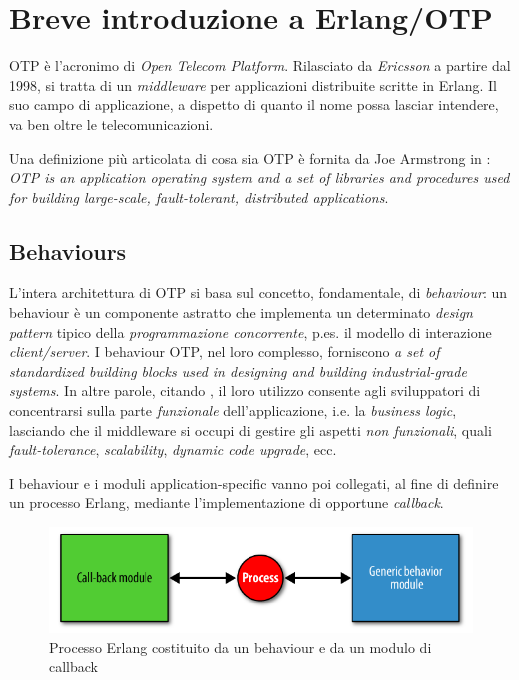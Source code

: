 %
\section{Breve introduzione a Erlang/OTP}
%
OTP \`e l'acronimo di \emph{Open Telecom Platform}. Rilasciato da \emph{Ericsson} 
a partire dal 1998, si tratta di un \emph{middleware} per applicazioni distribuite 
scritte in Erlang\cite{erlang}. Il suo campo di applicazione, a dispetto di quanto 
il nome possa lasciar intendere, va ben oltre le telecomunicazioni.
%

%
Una definizione pi\`u articolata di cosa sia OTP \`e fornita da Joe Armstrong in 
\cite{armstrong07}: \emph{OTP is an application operating system and a set of libraries 
and procedures used for building large-scale, fault-tolerant, distributed applications}.
%

%
\subsection{Behaviours}
%
L'intera architettura di OTP si basa sul concetto, fondamentale, di \emph{behaviour}:
un behaviour \`e un componente astratto che implementa un determinato 
\emph{design pattern} tipico della \emph{programmazione concorrente}, p.es. il modello di 
interazione \emph{client/server}. 
%
I behaviour OTP, nel loro complesso, forniscono \emph{a set of standardized building 
blocks used in designing and building industrial-grade systems}\cite{cesarini09}.
%
In altre parole, citando \cite{armstrong07}, il loro utilizzo consente agli sviluppatori 
di concentrarsi sulla parte \emph{funzionale} dell'applicazione, i.e. la \emph{business logic}, 
lasciando che il middleware si occupi di gestire gli aspetti \emph{non funzionali}, quali 
\emph{fault-tolerance}, \emph{scalability}, \emph{dynamic code upgrade}, ecc.
%

%
I behaviour e i moduli application-specific vanno poi collegati, al fine di definire 
un processo Erlang, mediante l'implementazione di opportune \emph{callback}.
%
\begin{figure}[!h]
\centering
\includegraphics[width=400pt]{img/erl-behaviour.png}
\caption{Processo Erlang costituito da un behaviour e da un modulo di callback}
\end{figure}
%


